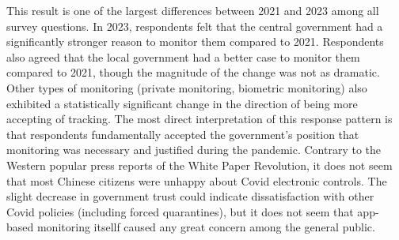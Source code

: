 \documentclass[
  letterpaper,
  DIV=11,
  numbers=noendperiod]{scrartcl}
\begin{document}
This result is one of the largest differences between 2021 and 2023
among all survey questions. In 2023, respondents felt that the central
government had a significantly stronger reason to monitor them compared
to 2021. Respondents also agreed that the local government had a better
case to monitor them compared to 2021, though the magnitude of the
change was not as dramatic. Other types of monitoring (private
monitoring, biometric monitoring) also exhibited a statistically
significant change in the direction of being more accepting of tracking.
The most direct interpretation of this response pattern is that
respondents fundamentally accepted the government's position that
monitoring was necessary and justified during the pandemic. Contrary to
the Western popular press reports of the White Paper Revolution, it does
not seem that most Chinese citizens were unhappy about Covid electronic
controls. The slight decrease in government trust could indicate
dissatisfaction with other Covid policies (including forced
quarantines), but it does not seem that app-based monitoring itsellf
caused any great concern among the general public.

\hypertarget{tbl-gm.q.text}{}
\begin{table}
\caption{\label{tbl-gm.q.text}Government and private monitoring questions }\tabularnewline

\centering
{}
\end{table}
\end{document}
